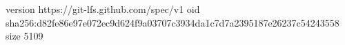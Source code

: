 version https://git-lfs.github.com/spec/v1
oid sha256:d82fe86e97e072ec9d624f9a03707c3934da1c7d7a2395187e26237c54243558
size 5109
